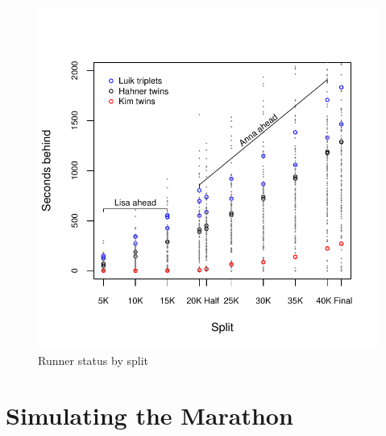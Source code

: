 \documentclass[12pt,titlepage]{article}
\begin{document}
\begin{figure}[!ht]
  \centering
  \caption{Runner status by split}
  \label{fig:secondsbehind}
  \includegraphics[scale = 1]{seconds-behind.pdf}
\end{figure}

\section*{Simulating the Marathon}

\end{document}
